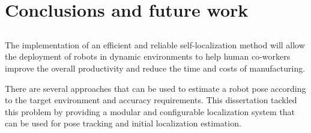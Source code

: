 \chapter{Conclusions and future work} \label{chap:conclusions-and-future-work}



\section*{}

The implementation of an efficient and reliable self-localization method will allow the deployment of robots in dynamic environments to help human co-workers improve the overall productivity and reduce the time and costs of manufacturing.

There are several approaches that can be used to estimate a robot pose according to the target environment and accuracy requirements. This dissertation tackled this problem by providing a modular and configurable localization system that can be used for pose tracking and initial localization estimation.
